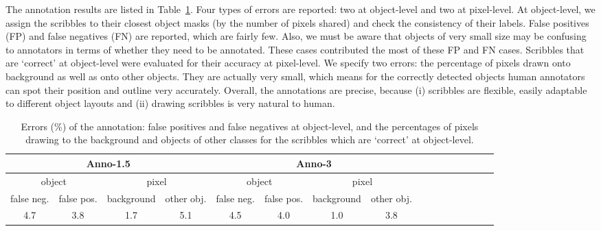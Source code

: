 \documentclass[runningheads]{llncs}
\begin{document}
The annotation results  are
listed in Table~\ref{table:anno}. Four types of errors are reported:
two at object-level and two at pixel-level. At object-level, we assign
the scribbles to their closest object masks (by the number of pixels
shared) and check the consistency of their labels. False positives (FP) and
false negatives (FN) are reported, which are fairly few. Also, we must be
aware that objects of very small size may be confusing to annotators
in terms of whether they need to be annotated. These cases
contributed the most of these FP and FN cases. Scribbles that are
`correct' at object-level were evaluated for their accuracy at
pixel-level. We specify two errors: the percentage of pixels drawn
onto background as well as onto other objects. They are actually very
small, which means for the correctly detected objects human annotators can spot
their position and outline very accurately.  Overall, the annotations are precise, because (i) scribbles are flexible,  easily adaptable to different object layouts and (ii) drawing scribbles is very natural to human.


\begin{table}[tb] %
\setlength\tabcolsep{1mm}
   \centering \small
  \begin{tabular}{|c|c|c|c|c|c|c|c|c|c|c|c|c|c|c|c|}  
    \hline \multicolumn{4}{|c|}{Anno-1.5} & \multicolumn{4}{c|}{Anno-3}  \\ \hline
     \multicolumn{2}{|c|}{object} & \multicolumn{2}{c|}{pixel} & \multicolumn{2}{|c|}{object} & \multicolumn{2}{c|}{pixel} \\ \hline
      false neg. & false pos. & background  & other obj. & false neg. & false pos. & background  & other obj.   \\ \hline
     4.7   & 3.8 &     1.7          & 5.1   &  4.5   & 4.0 &     1.0            & 3.8  \\  \hline
       \end{tabular}
       \caption{Errors (\%) of the annotation: false positives and false negatives  at object-level, and the percentages of pixels drawing to the background and objects of other classes for the scribbles which are `correct' at object-level. 
}
    \label{table:anno}         
     \vspace{-6mm}
\end{table}
\end{document}
